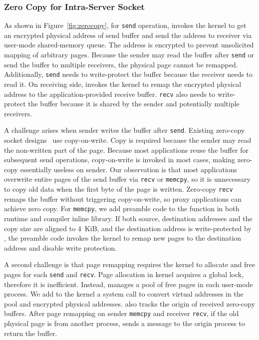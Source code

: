 \subsubsection{Zero Copy for Intra-Server Socket}
\label{subsec:zero-copy-intra}

As shown in Figure~\ref{fig:zerocopy}, for \texttt{send} operation, \libipc{} invokes the kernel to get an encrypted physical address of send buffer and send the address to receiver via user-mode shared-memory queue.
The address is encrypted to prevent unsolicited mapping of arbitrary pages.
Because the sender may read the buffer after \texttt{send} or send the buffer to multiple receivers, the physical page cannot be remapped.
Additionally, \texttt{send} needs to write-protect the buffer because the receiver needs to read it.
On receiving side, \libipc{} invokes the kernel to remap the encrypted physical address to the application-provided receive buffer.
\texttt{recv} also needs to write-protect the buffer because it is shared by the sender and potentially multiple receivers.

A challenge arises when sender writes the buffer after \texttt{send}.
Existing zero-copy socket designs~\cite{thadani1995efficient,chu1996zero} use copy-on-write. Copy is required because the sender may read the non-written part of the page.
Because most applications reuse the buffer for subsequent send operations, copy-on-write is invoked in most cases, making zero-copy essentially useless on sender.
Our observation is that most applications overwrite entire pages of the send buffer via \texttt{recv} or \texttt{memcpy}, so it is unnecessary to copy old data when the first byte of the page is written.
Zero-copy \texttt{recv} remaps the buffer without triggering copy-on-write, so proxy applications can achieve zero copy.
For \texttt{memcpy}, we add preamble code to the function in both \libipc{} runtime and compiler inline library. If both source, destination addresses and the copy size are aligned to 4~KiB, and the destination address is write-protected by \libipc{}, the preamble code invokes the kernel to remap new pages to the destination address and disable write protection.

A second challenge is that page remapping requires the kernel to allocate and free pages for each \texttt{send} and \texttt{recv}. Page allocation in kernel acquires a global lock, therefore it is inefficient. Instead, \libipc{} manages a pool of free pages in each user-mode process.
We add to the kernel a system call to convert virtual addresses in the pool and encrypted physical addresses.
\libipc{} also tracks the origin of received zero-copy buffers.
After page remapping on sender \texttt{memcpy} and receiver \texttt{recv}, if the old physical page is from another process, \libipc{} sends a message to the origin process to return the buffer.

